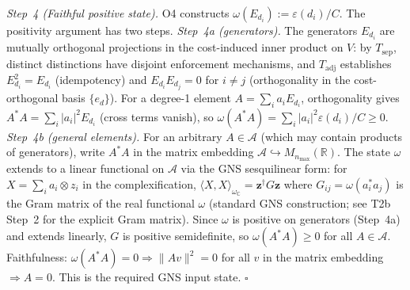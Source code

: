 \documentclass[11pt]{article}
\theoremstyle{remark}
\begin{document}
\begin{tcolorbox}[apfbox, title={T2a: Real $*$-Algebra from Enforcement Operations}]
\textit{Step~4 (Faithful positive state).}  O4 constructs $\omega(E_{d_i}) := \varepsilon(d_i)/C$.  The positivity argument has two steps.  \textit{Step~4a (generators).}  The generators $E_{d_i}$ are mutually orthogonal projections in the cost-induced inner product on $V$: by $T_{\mathrm{sep}}$, distinct distinctions have disjoint enforcement mechanisms, and $T_{\mathrm{adj}}$ establishes $E_{d_i}^2 = E_{d_i}$ (idempotency) and $E_{d_i} E_{d_j} = 0$ for $i \ne j$ (orthogonality in the cost-orthogonal basis $\{e_d\}$).  For a degree-1 element $A = \sum_i a_i E_{d_i}$, orthogonality gives $A^*A = \sum_i |a_i|^2 E_{d_i}$ (cross terms vanish), so $\omega(A^*A) = \sum_i |a_i|^2 \varepsilon(d_i)/C \ge 0$.  \textit{Step~4b (general elements).}  For an arbitrary $A \in \mathcal{A}$ (which may contain products of generators), write $A^*A$ in the matrix embedding $\mathcal{A} \hookrightarrow M_{n_{\max}}(\mathbb{R})$.  The state $\omega$ extends to a linear functional on $\mathcal{A}$ via the GNS sesquilinear form: for $X = \sum_i a_i \otimes z_i$ in the complexification, $\langle X, X \rangle_{\omega_\mathbb{C}} = \mathbf{z}^\dagger G \mathbf{z}$ where $G_{ij} = \omega(a_i^* a_j)$ is the Gram matrix of the real functional $\omega$ (standard GNS construction; see T2b Step~2 for the explicit Gram matrix).  Since $\omega$ is positive on generators (Step~4a) and extends linearly, $G$ is positive semidefinite, so $\omega(A^*A) \ge 0$ for all $A \in \mathcal{A}$.  Faithfulness: $\omega(A^*A) = 0 \Rightarrow \|Av\|^2 = 0$ for all $v$ in the matrix embedding $\Rightarrow A = 0$.  This is the required GNS input state.  \hfill$\square$
\end{tcolorbox}
\end{document}
